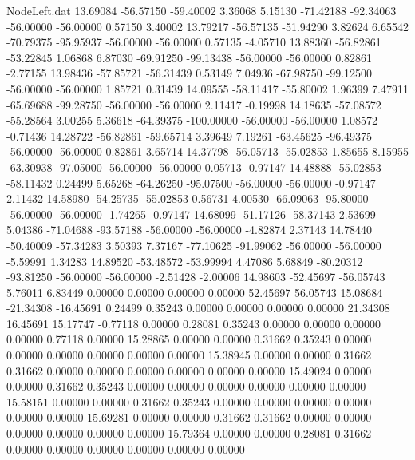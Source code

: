 \begin{filecontents}{NodeLeft.dat}
  13.69084  -56.57150  -59.40002     3.36068    5.15130  -71.42188  -92.34063  -56.00000  -56.00000    0.57150    3.40002
  13.79217  -56.57135  -51.94290     3.82624    6.65542  -70.79375  -95.95937  -56.00000  -56.00000    0.57135   -4.05710
  13.88360  -56.82861  -53.22845     1.06868    6.87030  -69.91250  -99.13438  -56.00000  -56.00000    0.82861   -2.77155
  13.98436  -57.85721  -56.31439     0.53149    7.04936  -67.98750  -99.12500  -56.00000  -56.00000    1.85721    0.31439
  14.09555  -58.11417  -55.80002     1.96399    7.47911  -65.69688  -99.28750  -56.00000  -56.00000    2.11417   -0.19998
  14.18635  -57.08572  -55.28564     3.00255    5.36618  -64.39375 -100.00000  -56.00000  -56.00000    1.08572   -0.71436
  14.28722  -56.82861  -59.65714     3.39649    7.19261  -63.45625  -96.49375  -56.00000  -56.00000    0.82861    3.65714
  14.37798  -56.05713  -55.02853     1.85655    8.15955  -63.30938  -97.05000  -56.00000  -56.00000    0.05713   -0.97147
  14.48888  -55.02853  -58.11432     0.24499    5.65268  -64.26250  -95.07500  -56.00000  -56.00000   -0.97147    2.11432
  14.58980  -54.25735  -55.02853     0.56731    4.00530  -66.09063  -95.80000  -56.00000  -56.00000   -1.74265   -0.97147
  14.68099  -51.17126  -58.37143     2.53699    5.04386  -71.04688  -93.57188  -56.00000  -56.00000   -4.82874    2.37143
  14.78440  -50.40009  -57.34283     3.50393    7.37167  -77.10625  -91.99062  -56.00000  -56.00000   -5.59991    1.34283
  14.89520  -53.48572  -53.99994     4.47086    5.68849  -80.20312  -93.81250  -56.00000  -56.00000   -2.51428   -2.00006
  14.98603  -52.45697  -56.05743     5.76011    6.83449    0.00000    0.00000    0.00000    0.00000   52.45697   56.05743
  15.08684  -21.34308  -16.45691     0.24499    0.35243    0.00000    0.00000    0.00000    0.00000   21.34308   16.45691
  15.17747   -0.77118    0.00000     0.28081    0.35243    0.00000    0.00000    0.00000    0.00000    0.77118    0.00000
  15.28865    0.00000    0.00000     0.31662    0.35243    0.00000    0.00000    0.00000    0.00000    0.00000    0.00000
  15.38945    0.00000    0.00000     0.31662    0.31662    0.00000    0.00000    0.00000    0.00000    0.00000    0.00000
  15.49024    0.00000    0.00000     0.31662    0.35243    0.00000    0.00000    0.00000    0.00000    0.00000    0.00000
  15.58151    0.00000    0.00000     0.31662    0.35243    0.00000    0.00000    0.00000    0.00000    0.00000    0.00000
  15.69281    0.00000    0.00000     0.31662    0.31662    0.00000    0.00000    0.00000    0.00000    0.00000    0.00000
  15.79364    0.00000    0.00000     0.28081    0.31662    0.00000    0.00000    0.00000    0.00000    0.00000    0.00000

\end{filecontents}
